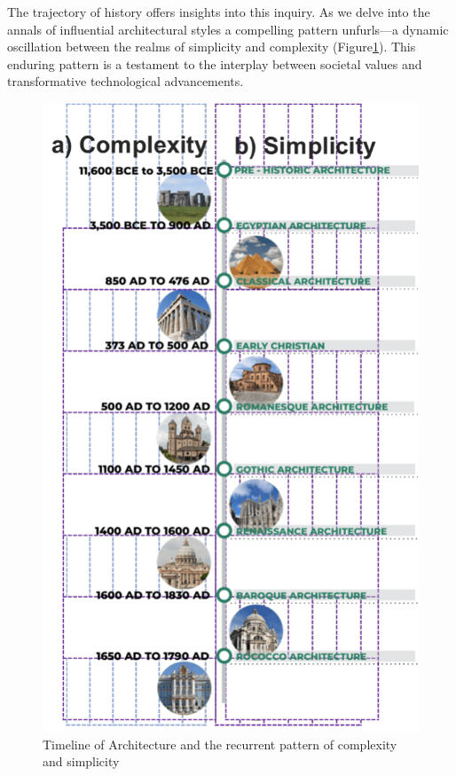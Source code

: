 The trajectory of history offers insights into this inquiry.
As we delve into the annals of influential architectural styles a compelling pattern unfurls—a dynamic oscillation between the realms of simplicity and complexity (Figure\ref{fig:TimelineArchitecture}).
This enduring pattern is a testament to the interplay between societal values and transformative technological advancements.
     \begin{figure}[htb]
          \centering
          \includegraphics[width= \linewidth]{Images/TimelineArchitecture}
          \caption{Timeline of Architecture and the recurrent pattern of complexity and simplicity}
          \label{fig:TimelineArchitecture}
        \end{figure}

